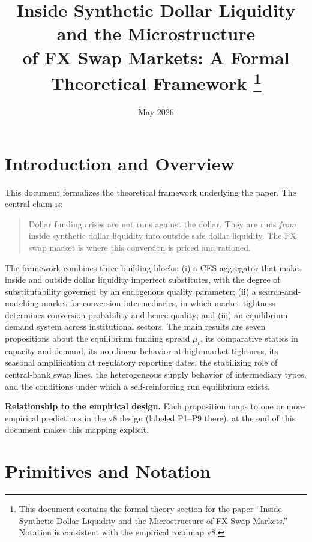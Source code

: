 \documentclass[12pt]{article}
\title{Inside Synthetic Dollar Liquidity and the Microstructure\\
       of FX Swap Markets: A Formal Theoretical Framework%
       \thanks{This document contains the formal theory section for the paper
       ``Inside Synthetic Dollar Liquidity and the Microstructure of FX Swap
       Markets.'' Notation is consistent with the empirical roadmap v8.}}
\author{}
\date{May 2026}
\theoremstyle{definition}
\newcommand{\1}[1]{\mathds{1}\left[#1\right]}
\begin{document}
\maketitle
\thispagestyle{empty}
\newpage
\setcounter{page}{1}

\section{Introduction and Overview}
\label{sec:intro}

This document formalizes the theoretical framework underlying the paper. The
central claim is:

\begin{quote}
  Dollar funding crises are not runs against the dollar. They are runs \emph{from}
  inside synthetic dollar liquidity into outside safe dollar liquidity. The FX
  swap market is where this conversion is priced and rationed.
\end{quote}

The framework combines three building blocks: (i) a CES aggregator that makes
inside and outside dollar liquidity imperfect substitutes, with the degree of
substitutability governed by an endogenous quality parameter; (ii) a
search-and-matching market for conversion intermediaries, in which market
tightness determines conversion probability and hence quality; and (iii) an
equilibrium demand system across institutional sectors. The main results are
seven propositions about the equilibrium funding spread $\mu_t$, its
comparative statics in capacity and demand, its non-linear behavior at high
market tightness, its seasonal amplification at regulatory reporting dates, the
stabilizing role of central-bank swap lines, the heterogeneous supply behavior
of intermediary types, and the conditions under which a self-reinforcing run
equilibrium exists.

\bigskip

\noindent\textbf{Relationship to the empirical design.} Each proposition maps to
one or more empirical predictions in the v8 design (labeled P1--P9 there).
 at the end of this document makes this mapping
explicit.

\section{Primitives and Notation}
\label{sec:notation}
\end{document}
